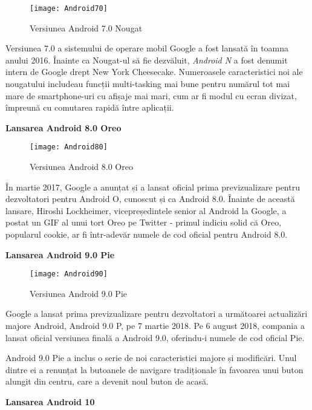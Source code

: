 \documentclass[a4paper]{article}
\begin{document}
\begin{figure}[h]
	\centering
	\texttt{[image: Android70]} \\
	\caption{Versiunea Android 7.0 Nougat}
	\label{fig:Android70}
\end{figure}
\par
Versiunea 7.0 a sistemului de operare mobil Google a fost lansată în toamna anului 2016. Înainte ca Nougat-ul să fie dezvăluit, \textit{Android N} a fost denumit intern de Google drept New York Cheesecake. Numeroasele caracteristici noi ale nougatului includeau funcții multi-tasking mai bune pentru numărul tot mai mare de smartphone-uri cu afișaje mai mari, cum ar fi modul cu ecran divizat, împreună cu comutarea rapidă între aplicații.
\begin{center}
	\large\textbf{Lansarea Android 8.0 Oreo}
\end{center}
\begin{figure}[h]
	\centering
	\texttt{[image: Android80]} \\
	\caption{Versiunea Android 8.0 Oreo}
	\label{fig:Android80}
\end{figure}
\par
În martie 2017, Google a anunțat și a lansat oficial prima previzualizare pentru dezvoltatori pentru Android O, cunoscut și ca Android 8.0. Înainte de această lansare, Hiroshi Lockheimer, vicepreședintele senior al Android la Google, a postat un GIF al unui tort Oreo pe Twitter - primul indiciu solid că Oreo, popularul cookie, ar fi într-adevăr numele de cod oficial pentru Android 8.0.
\clearpage
\begin{center}
	\large\textbf{Lansarea Android 9.0 Pie}
\end{center}

\begin{figure}[h]
	\centering
	\texttt{[image: Android90]} \\
	\caption{Versiunea Android 9.0 Pie}
	\label{fig:Android90}
\end{figure}
\par
Google a lansat prima previzualizare pentru dezvoltatori a următoarei actualizări majore Android, Android 9.0 P, pe 7 martie 2018. Pe 6 august 2018, compania a lansat oficial versiunea finală a Android 9.0, oferindu-i numele de cod oficial Pie.
\par
Android 9.0 Pie a inclus o serie de noi caracteristici majore și modificări. Unul dintre ei a renunțat la butoanele de navigare tradiționale în favoarea unui buton alungit din centru, care a devenit noul buton de acasă.
\begin{center}
	\large\textbf{Lansarea Android 10}
\end{center}
\end{document}
